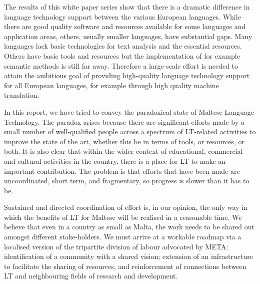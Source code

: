 \begin{multicols}{2}
The results of this white paper series show that there is a dramatic difference in language technology support between the various European languages. While there are good quality software and resources available for some languages and application areas, others, usually smaller languages, have substantial gaps. Many languages lack basic technologies for text analysis and the essential resources. Others have basic tools and resources but the implementation of for example semantic methods is still far away. Therefore a large-scale effort is needed to attain the ambitious goal of providing high-quality language technology support for all European languages, for example through high quality machine translation. 

In this report, we have tried to convey the paradoxical state of Maltese Language Technology. The paradox arises because there are significant efforts made by a small number of well-qualified people across a spectrum of LT-related activities to improve the state of the art, whether this be in terms of tools, or resources, or both. It is also clear that within the wider context of educational, commercial and cultural activities in the country, there is a place for LT to make an important contribution. The problem is that efforts that have been made are uncoordinated, short term, and fragmentary, so progress is slower than it has to be.

Sustained and directed coordination of effort is, in our opinion, the only way in which the benefits of LT for Maltese will be realised in a reasonable time. We believe that even in a country as small as Malta, the work needs to be shared out amongst different stake-holders. We must arrive at a workable roadmap via a localised version of the tripartite division of labour advocated by META: identification of a community with a shared vision; extension of an infrastructure to facilitate the sharing of resources, and reinforcement of connections between LT and neighbouring fields of research and development.



\end{multicols}
